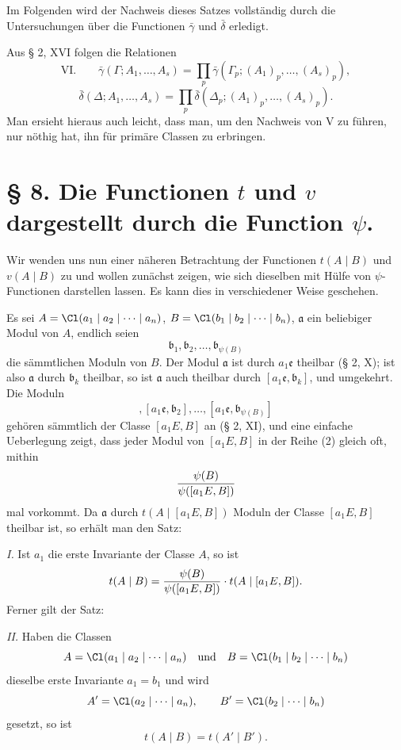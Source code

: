Im Folgenden wird der Nachweis dieses Satzes vollständig durch die Untersuchungen über die Functionen $\bar\gamma$ und $\bar\delta$ erledigt.

Aus § 2, XVI folgen die Relationen
\[
\text{VI.}\qquad
 \bar\gamma(\Gamma;A_1,\ldots,A_s)
 =\prod_p \bar\gamma(\Gamma_p;(A_1)_p,\ldots,(A_s)_p),
\]
\[
 \bar\delta(\Delta;A_1,\ldots,A_s)
 =\prod_p \bar\delta(\Delta_p;(A_1)_p,\ldots,(A_s)_p).
\]
Man ersieht hieraus auch leicht, dass man, um den Nachweis von V zu führen, nur nöthig hat, ihn für primäre Classen zu erbringen.

\section*{§ 8. Die Functionen $t$ und $v$ dargestellt durch die Function $\psi$.}

Wir wenden uns nun einer näheren Betrachtung der Functionen $t(A\mid B)$ und $v(A\mid B)$ zu und wollen zunächst zeigen, wie sich dieselben mit Hülfe von $\psi$-Functionen darstellen lassen. Es kann dies in verschiedener Weise geschehen.

Es sei $A=\Cl(a_1\mid a_2\mid\cdots\mid a_n)$, $B=\Cl(b_1\mid b_2\mid\cdots\mid b_n)$, $\mathfrak a$ ein beliebiger Modul von $A$, endlich seien
\begin{equation}
 \mathfrak b_1,\mathfrak b_2,\ldots,\mathfrak b_{\psi(B)}
\tag{1}
\end{equation}
die sämmtlichen Moduln von $B$. Der Modul $\mathfrak a$ ist durch $a_1\mathfrak e$ theilbar (§ 2, X); ist also $\mathfrak a$ durch $\mathfrak b_k$ theilbar, so ist $\mathfrak a$ auch theilbar durch $[a_1\mathfrak e,\mathfrak b_k]$, und umgekehrt. Die Moduln
\begin{equation}
 [a_1\mathfrak e,\mathfrak b_1],
 [a_1\mathfrak e,\mathfrak b_2],\ldots,
 [a_1\mathfrak e,\mathfrak b_{\psi(B)}]
\tag{2}
\end{equation}
gehören sämmtlich der Classe $[a_1E,B]$ an (§ 2, XI), und eine einfache Ueberlegung zeigt, dass jeder Modul von $[a_1E,B]$ in der Reihe (2) gleich oft, mithin
\[
 {\psi(B)\over\psi([a_1E,B])}
\]
mal vorkommt. Da $\mathfrak a$ durch $t(A\mid [a_1E,B])$ Moduln der Classe $[a_1E,B]$ theilbar ist, so erhält man den Satz:

\emph{I.} Ist $a_1$ die erste Invariante der Classe $A$, so ist
\[
 t(A\mid B)={\psi(B)\over\psi([a_1E,B])}\cdot t(A\mid [a_1E,B]).
\]
Ferner gilt der Satz:

\emph{II.} Haben die Classen
\[
 A=\Cl(a_1\mid a_2\mid\cdots\mid a_n)
 \quad\text{und}\quad
 B=\Cl(b_1\mid b_2\mid\cdots\mid b_n)
\]
dieselbe erste Invariante $a_1=b_1$ und wird
\[
 A'=\Cl(a_2\mid\cdots\mid a_n),
 \qquad
 B'=\Cl(b_2\mid\cdots\mid b_n)
\]
gesetzt, so ist
\[
 t(A\mid B)=t(A'\mid B').
\]

